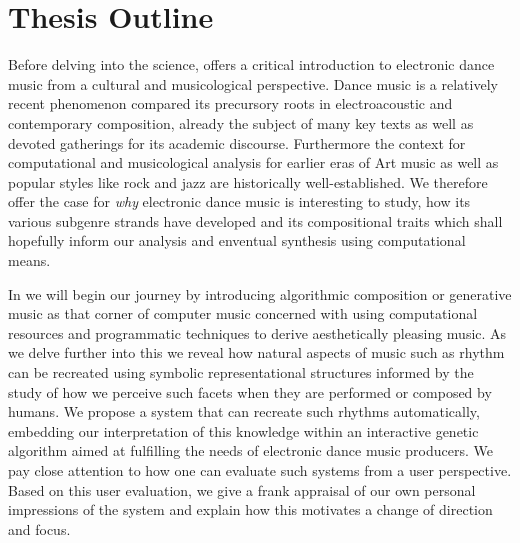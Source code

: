 \section{Thesis Outline}


Before delving into the science,  offers a critical introduction to electronic dance music from a cultural and musicological perspective. Dance music is a relatively recent phenomenon compared its precursory roots in electroacoustic and contemporary composition, already the subject of many key texts as well as devoted gatherings for its academic discourse. Furthermore the context for computational and musicological analysis for earlier eras of Art music as well as popular styles like rock and jazz are historically well-established. We therefore offer the case for \textit{why} electronic dance music is interesting to study, how its various subgenre strands have developed and its compositional traits which shall hopefully inform our analysis and enventual synthesis using computational means. 

In  we will begin our journey by introducing algorithmic composition or generative music as that corner of computer music concerned with using computational resources and programmatic techniques to derive aesthetically pleasing music. As we delve further into this we reveal how natural aspects of music such as rhythm can be recreated using symbolic representational structures informed by the study of how we perceive such facets when they are performed or composed by humans. We propose a system that can recreate such rhythms automatically, embedding our interpretation of this knowledge within an interactive genetic algorithm aimed at fulfilling the needs of electronic dance music producers. We pay close attention to how one can evaluate such systems from a user perspective. Based on this user evaluation, we give a frank appraisal of our own personal impressions of the system and explain how this motivates a change of direction and focus.

